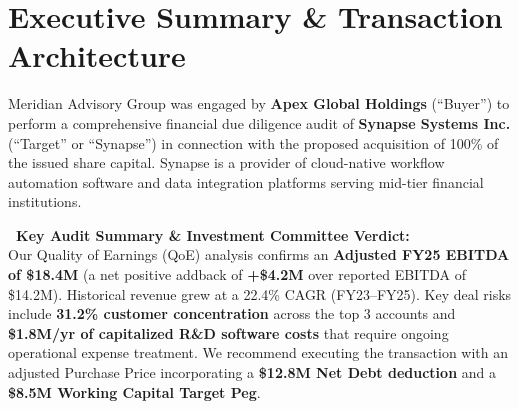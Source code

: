 \documentclass[10pt,a4paper,oneside]{scrreprt}
\begin{document}
\vspace{0.12cm}

\chapter{Executive Summary \& Transaction Architecture}

Meridian Advisory Group was engaged by \textbf{Apex Global Holdings} (``Buyer'') to perform a comprehensive financial due diligence audit of \textbf{Synapse Systems Inc.} (``Target'' or ``Synapse'') in connection with the proposed acquisition of 100\% of the issued share capital. Synapse is a provider of cloud-native workflow automation software and data integration platforms serving mid-tier financial institutions.

\begin{tcolorbox}[calloutbox]
  \textbf{\textcolor{NavyBlue}{\faCheckCircle\ Key Audit Summary \& Investment Committee Verdict:}} \\
  Our Quality of Earnings (QoE) analysis confirms an \textbf{Adjusted FY25 EBITDA of \$18.4M} (a net positive addback of \textbf{+\$4.2M} over reported EBITDA of \$14.2M). Historical revenue grew at a 22.4\% CAGR (FY23--FY25). Key deal risks include \textbf{31.2\% customer concentration} across the top 3 accounts and \textbf{\$1.8M/yr of capitalized R\&D software costs} that require ongoing operational expense treatment. We recommend executing the transaction with an adjusted Purchase Price incorporating a \textbf{\$12.8M Net Debt deduction} and a \textbf{\$8.5M Working Capital Target Peg}.
\end{tcolorbox}

\vspace{0.02cm}
\end{document}
